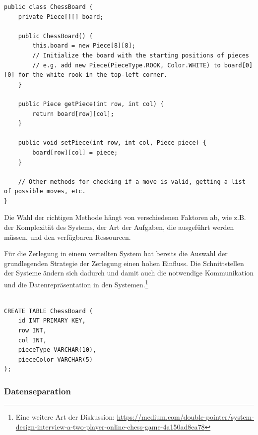 \documentclass[../vs-script-first-v01.tex]{subfiles}
\begin{document}
\noindent\begin{minipage}{\textwidth}
\begin{lstlisting}[caption={Schachbrett - Objektorientiert},captionpos=b,label={lst:schachbrett-oo}]
public class ChessBoard {
    private Piece[][] board;

    public ChessBoard() {
        this.board = new Piece[8][8];
        // Initialize the board with the starting positions of pieces
        // e.g. add new Piece(PieceType.ROOK, Color.WHITE) to board[0][0] for the white rook in the top-left corner.
    }

    public Piece getPiece(int row, int col) {
        return board[row][col];
    }

    public void setPiece(int row, int col, Piece piece) {
        board[row][col] = piece;
    }

    // Other methods for checking if a move is valid, getting a list of possible moves, etc.
}
\end{lstlisting}
\end{minipage}

Die Wahl der richtigen Methode hängt von verschiedenen Faktoren ab, wie z.B. der Komplexität des Systems, der Art der Aufgaben, die ausgeführt werden müssen, und den verfügbaren Ressourcen.

Für die Zerlegung in einem verteilten System hat bereits die Auswahl der grundlegenden Strategie der Zerlegung einen hohen Einfluss. Die Schnittstellen der Systeme ändern sich dadurch und damit auch die notwendige Kommunikation und die Datenrepräsentation in den Systemen.\footnote{Eine weitere Art der Diskussion: \url{https://medium.com/double-pointer/system-design-interview-a-two-player-online-chess-game-4a150ad8ea78} }

\noindent\begin{minipage}{\textwidth}
\begin{lstlisting}[caption={Schachbrett - Datenbank},captionpos=b,label={lst:schachbrett-datenbank}]

CREATE TABLE ChessBoard (
    id INT PRIMARY KEY,
    row INT,
    col INT,
    pieceType VARCHAR(10),
    pieceColor VARCHAR(5)
);
\end{lstlisting}
\end{minipage}


\subsubsection{Datenseparation}
\end{document}

